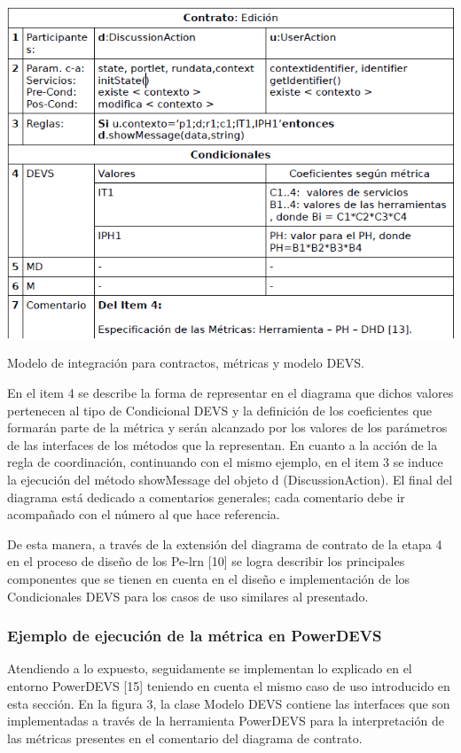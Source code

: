 \begin{center}
 \includegraphics[width=5 in,totalheight=4 in] {Ch9/f4}
\end{center}
\caption{Modelo de integración para contractos, métricas y modelo DEVS.}

En el item 4 se describe la forma de representar en el diagrama que dichos
valores pertenecen al tipo de Condicional DEVS y la definición de los
coeficientes que formarán parte de la métrica y serán alcanzado por los valores
de los parámetros de las interfaces de los métodos que la representan.
En cuanto a la acción de la regla de coordinación, continuando con el mismo
ejemplo, en el item 3 se induce  la ejecución del método showMessage del objeto
d (DiscussionAction). El final del diagrama está dedicado a comentarios
generales; cada comentario debe ir acompañado con el número al que hace
referencia.


De esta manera, a través de la extensión del diagrama de contrato de la etapa 4
en el proceso de diseño de los Pe-lrn [10] se logra describir los principales
componentes que se tienen en cuenta en el diseño e implementación de los
Condicionales DEVS  para los casos de uso similares al presentado.

\subsubsection{Ejemplo de ejecución de la métrica en PowerDEVS}


Atendiendo a lo expuesto, seguidamente se implementan lo explicado en el entorno
PowerDEVS [15] teniendo en cuenta el mismo caso de uso introducido en esta
sección. En la figura 3, la clase Modelo DEVS contiene las interfaces que son
implementadas a través de la herramienta PowerDEVS para la interpretación de las
métricas presentes en el comentario del diagrama de contrato.


